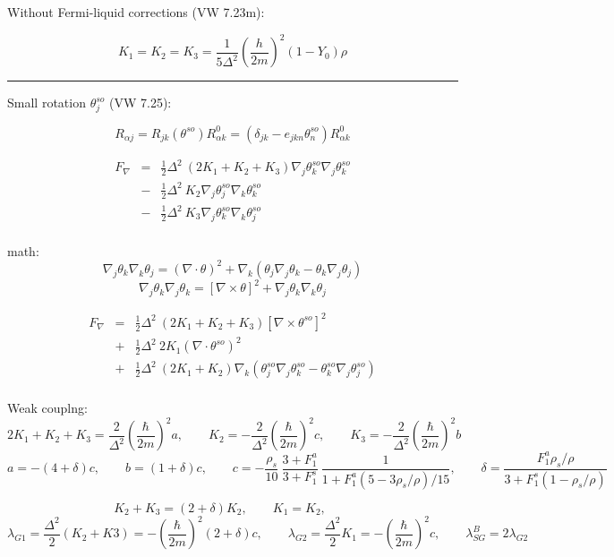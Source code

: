 \documentclass[a4paper]{article}
\begin{document}
Without Fermi-liquid corrections (VW 7.23m):

$$
K_1=K_2=K_3 = \frac{1}{5\Delta^2} \left(\frac{h}{2m}\right)^2 (1-Y_0)\rho
$$

\eject

\hrule
\medskip

Small rotation $\theta^{so}_j$ (VW 7.25):

$$
R_{\alpha j} = R_{jk}(\theta^{so}) R^0_{\alpha k} =
(\delta_{jk} - e_{jkn}\theta^{so}_n) R^0_{\alpha k}
$$

\begin{eqnarray*}
F_\nabla
&=& \frac12 \Delta^2\ (2 K_1 + K_2 + K_3)
\nabla_j\theta^{so}_k \nabla_j\theta^{so}_k\\
&-& \frac12 \Delta^2\ K_2
\nabla_j\theta^{so}_j \nabla_k\theta^{so}_k\\
&-& \frac12 \Delta^2\ K_3
\nabla_j\theta^{so}_k \nabla_k\theta^{so}_j\\
\end{eqnarray*}

math:
$$
\nabla_j \theta_k \nabla_k \theta_j = (\nabla \cdot \theta)^2 +
\nabla_k(\theta_j \nabla_j\theta_k - \theta_k \nabla_j\theta_j)
$$
$$
 \nabla_j \theta_k \nabla_j \theta_k = [\nabla \times \theta]^2 + \nabla_j \theta_k \nabla_k \theta_j
$$

\begin{eqnarray*}
F_\nabla
&=& \frac12 \Delta^2\ (2 K_1 + K_2 + K_3)
[\nabla \times \theta^{so}]^2\\
&+& \frac12 \Delta^2\  2K_1
(\nabla \cdot \theta^{so})^2\\
&+& \frac12 \Delta^2\ (2 K_1+K_2)
\nabla_k(\theta^{so}_j \nabla_j\theta^{so}_k - \theta^{so}_k \nabla_j\theta^{so}_j)\\
\end{eqnarray*}

Weak couplng:
$$
2 K_1 + K_2 + K_3 = \frac{2}{\Delta^2}\left(\frac{\hbar}{2m}\right)^2 a,
\qquad
K_2 = -\frac{2}{\Delta^2}\left(\frac{\hbar}{2m}\right)^2 c,
\qquad
K_3 = -\frac{2}{\Delta^2}\left(\frac{\hbar}{2m}\right)^2 b
$$
$$
a=-(4+\delta)c,\qquad
b= (1+\delta)c,\qquad
c=-\frac{\rho_s}{10}
\ \frac{3+F_1^a}{3+F_1^s}
\ \frac{1}{1+F_1^a(5-3\rho_s/\rho)/15}
,\qquad
\delta = \frac{F_1^a \rho_s/\rho}{3+F_1^s(1-\rho_s/\rho)}
$$

$$
K_2+K_3 = (2+\delta)K_2,\qquad
K_1=K_2,\qquad
$$
$$
\lambda_{G1} = \frac{\Delta^2}{2}(K_2+K3) = -\left(\frac{\hbar}{2m}\right)^2 (2+\delta) c,\qquad
\lambda_{G2} = \frac{\Delta^2}{2}K_1 = -\left(\frac{\hbar}{2m}\right)^2 c,\qquad
\lambda_{SG}^B = 2\lambda_{G2}
$$
\end{document}
